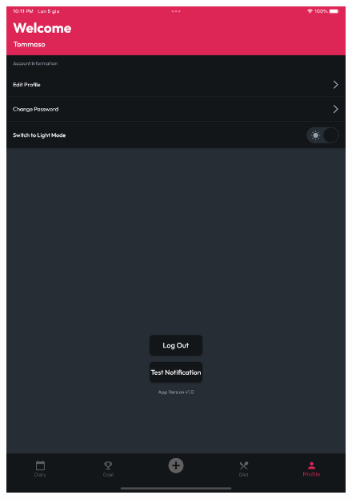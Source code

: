 \documentclass{Configuration_Files/PoliMi3i_thesis}
\begin{document}
\begin{figure}[!h]
  \centering
  \includegraphics[scale=0.1]{Images/Screenshots/Tablet/ProfileTablet.png}

\end{figure}
\end{document}
